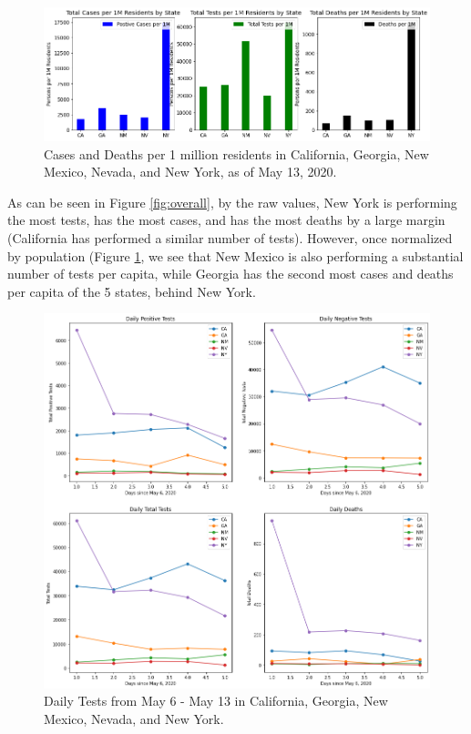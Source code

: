 \documentclass[11pt]{article}
\begin{document}
\FloatBarrier
\begin{figure}[h]
    \centering
    \includegraphics[width=\linewidth]{diagrams/analysis/total_cases_capita_bar.png}
    \caption{Cases and Deaths per 1 million residents in California, Georgia, New Mexico, Nevada, and New York, as of May 13, 2020.}
    \label{fig:capita}
\end{figure}
\FloatBarrier

\noindent
As can be seen in Figure \ref{fig:overall}, by the raw values, New York is performing the most tests, has the most cases, and has the most deaths by a large margin (California has performed a similar number of tests). However, once normalized by population (Figure \ref{fig:capita}, we see that New Mexico is also performing a substantial number of tests per capita, while Georgia has the second most cases and deaths per capita of the 5 states, behind New York.

\pagebreak

\FloatBarrier
\begin{figure}[h]
    \centering
    \includegraphics[width=\linewidth]{diagrams/analysis/daily_tests.png}
    \caption{Daily Tests from May 6 - May 13 in California, Georgia, New Mexico, Nevada, and New York.}
    \label{fig:dailytests}
\end{figure}
\FloatBarrier
\end{document}
